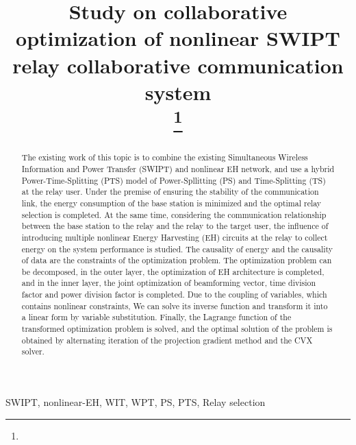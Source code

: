 \documentclass[conference]{IEEEtran}
\begin{document}
\title{Study on collaborative optimization of nonlinear SWIPT relay collaborative communication system\\
\thanks{}
}


\maketitle

\begin{abstract}
The existing work of this topic is to combine the existing Simultaneous Wireless Information and Power Transfer (SWIPT) and nonlinear EH network, and use a hybrid Power-Time-Splitting (PTS) model of Power-Spllitting (PS) and Time-Splitting (TS) at the relay user. 
Under the premise of ensuring the stability of the communication link, the energy consumption of the base station is minimized and the optimal relay selection is completed. 
At the same time, considering the communication relationship between the base station to the relay and the relay to the target user, the influence of introducing multiple nonlinear Energy Harvesting (EH) circuits at the relay to collect energy on the system performance is studied. 
The causality of energy and the causality of data are the constraints of the optimization problem. The optimization problem can be decomposed, in the outer layer, the optimization of EH architecture is completed, and in the inner layer, the joint optimization of beamforming vector, time division factor and power division factor is completed. Due to the coupling of variables, which contains nonlinear constraints, We can solve its inverse function and transform it into a linear form by variable substitution. 
Finally, the Lagrange function of the transformed optimization problem is solved, and the optimal solution of the problem is obtained by alternating iteration of the projection gradient method and the CVX solver.
\end{abstract}

\begin{IEEEkeywords}
SWIPT, nonlinear-EH, WIT, WPT, PS, PTS, Relay selection
\end{IEEEkeywords}
\end{document}

